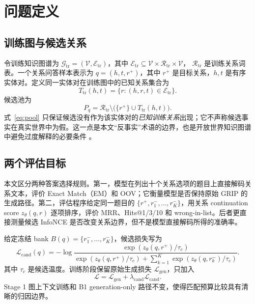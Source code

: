 \section{问题定义}

\subsection{训练图与候选关系}

令训练知识图谱为 $\mathcal{G}_{\mathrm{tr}}=(\mathcal{V},\mathcal{E}_{\mathrm{tr}})$，其中
$\mathcal{E}_{\mathrm{tr}}\subseteq \mathcal{V}\times\mathcal{R}_{\mathrm{tr}}\times\mathcal{V}$，
$\mathcal{R}_{\mathrm{tr}}$ 是训练关系词表。一个关系问答样本表示为
$q=(h,t,r^+)$，其中 $r^+$ 是目标关系，$h,t$ 是有序实体对。定义同一实体对在训练图中的已知关系集合为
\begin{equation}
    T_{\mathrm{tr}}(h,t)=\{r:(h,r,t)\in\mathcal{E}_{\mathrm{tr}}\}.
\end{equation}
候选池为
\begin{equation}
    P_q=\mathcal{R}_{\mathrm{tr}}\setminus\bigl(\{r^+\}\cup T_{\mathrm{tr}}(h,t)\bigr).
    \label{eq:pool}
\end{equation}
式~\ref{eq:pool} 只保证候选没有作为该实体对的\emph{已知训练关系}出现；它不声称候选事实在真实世界中为假。这一点是本文“反事实”术语的边界，也是开放世界知识图谱中避免过度解释的必要条件 \citep{ji2022survey,hogan2021kg}。

\subsection{两个评估目标}

本文区分两种答案选择规则。第一，模型在列出十个关系选项的题目上直接解码关系文本，评价 Exact Match（EM）和 OOV；它衡量模型是否保持原始 GRIP 的生成路径。第二，评估程序给定同一题目的 $\{r^+,r_1^-,\ldots,r_K^-\}$，用关系 continuation score $z_\theta(q,r)$ 逐项排序，评价 MRR、Hits@1/3/10 和 wrong-in-list。后者更直接测量候选 InfoNCE 是否改变关系边界，但不是模型直接解码所得的准确率。

给定冻结 bank $B(q)=\{r_1^-,\ldots,r_K^-\}$，候选损失写为
\begin{equation}
    \mathcal{L}_{\mathrm{cand}}(q)=-\log
    \frac{\exp(z_\theta(q,r^+)/\tau_c)}
    {\exp(z_\theta(q,r^+)/\tau_c)+\sum_{k=1}^K\exp(z_\theta(q,r_k^-)/\tau_c)}.
    \label{eq:infonce}
\end{equation}
其中 $\tau_c$ 是候选温度。训练阶段保留原始生成损失 $\mathcal{L}_{\mathrm{gen}}$，只加入
\begin{equation}
    \mathcal{L}=\mathcal{L}_{\mathrm{gen}}+\lambda_{\mathrm{cand}}\mathcal{L}_{\mathrm{cand}}.
    \label{eq:total}
\end{equation}
Stage 1 图上下文训练和 B1 generation-only 路径不变，使得匹配预算比较具有清晰的归因边界。
